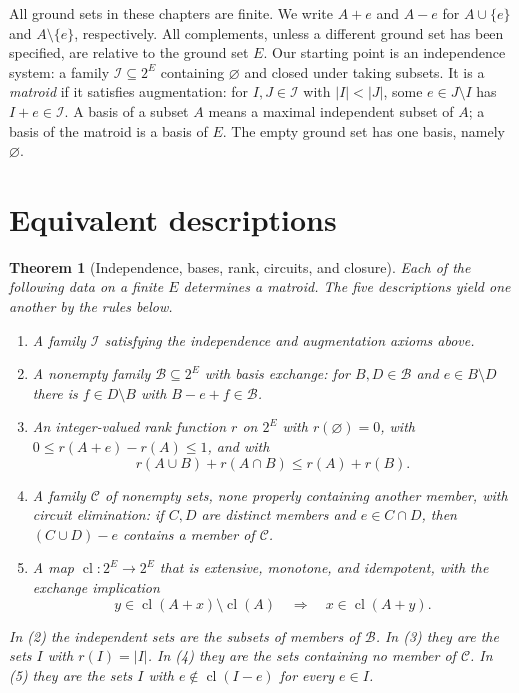 \documentclass[11pt,oneside,openany]{book}
\theoremstyle{plain}
\newtheorem{theorem}{Theorem}[chapter]
\theoremstyle{definition}
\theoremstyle{remark}
\begin{document}
All ground sets in these chapters are finite. We write \(A+e\) and
\(A-e\) for \(A\cup\{e\}\) and \(A\setminus\{e\}\), respectively.
All complements, unless a different ground set has been specified,
are relative to the ground set \(E\). Our starting point is an
independence system: a family \(\mathcal I\subseteq 2^E\) containing
\(\varnothing\) and closed under taking subsets. It is a
\emph{matroid} if it satisfies augmentation: for \(I,J\in\mathcal I\)
with \(|I|<|J|\), some \(e\in J\setminus I\) has \(I+e\in\mathcal I\).
A basis of a subset \(A\) means a maximal independent subset of
\(A\); a basis of the matroid is a basis of \(E\). The empty ground
set has one basis, namely \(\varnothing\).

\section{Equivalent descriptions}

\begin{theorem}[Independence, bases, rank, circuits, and closure]
\label{p204:W64}
Each of the following data on a finite \(E\) determines a matroid.
The five descriptions yield one another by the rules below.
\begin{enumerate}
\item A family \(\mathcal I\) satisfying the independence and
augmentation axioms above.
\item A nonempty family \(\mathcal B\subseteq 2^E\) with basis
exchange: for \(B,D\in\mathcal B\) and \(e\in B\setminus D\) there
is \(f\in D\setminus B\) with \(B-e+f\in\mathcal B\).
\item An integer-valued rank function \(r\) on \(2^E\) with
\(r(\varnothing)=0\), with
\(0\le r(A+e)-r(A)\le 1\), and with
\[
 r(A\cup B)+r(A\cap B)\le r(A)+r(B).
\]
\item A family \(\mathcal C\) of nonempty sets, none properly
containing another member, with circuit elimination: if \(C,D\)
are distinct members and \(e\in C\cap D\), then
\((C\cup D)-e\) contains a member of \(\mathcal C\).
\item A map \(\operatorname{cl}:2^E\to 2^E\) that is extensive,
monotone, and idempotent, with the exchange implication
\[
 y\in\operatorname{cl}(A+x)\setminus\operatorname{cl}(A)
 \quad\Longrightarrow\quad
 x\in\operatorname{cl}(A+y).
\]
\end{enumerate}
In (2) the independent sets are the subsets of members of
\(\mathcal B\). In (3) they are the sets \(I\) with \(r(I)=|I|\).
In (4) they are the sets containing no member of \(\mathcal C\).
In (5) they are the sets \(I\) with
\(e\notin\operatorname{cl}(I-e)\) for every \(e\in I\).
\end{theorem}
\end{document}
